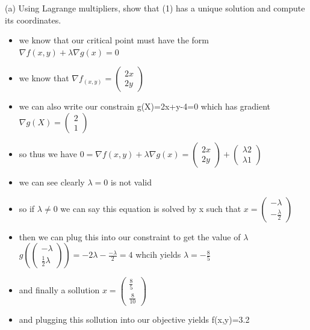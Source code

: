 \documentclass[10pt]{article}
\begin{document}
(a) Using Lagrange multipliers, show that (1) has a unique solution and compute its coordinates.
\begin{itemize}
    \item we know that our critical point must have the form $\nabla f(x,y)+\lambda \nabla g(x)=0$
    \item we know that $\nabla f_(x,y)=\begin{pmatrix}
        2x\\2y
    \end{pmatrix}$
    \item we can also write our constrain g(X)=2x+y-4=0 which has gradient $\nabla g(X)=\begin{pmatrix}
        2\\1
    \end{pmatrix}$
    \item so thus we have  $0=\nabla f(x,y)+\lambda \nabla g(x)=\begin{pmatrix}
        2x\\2y
    \end{pmatrix}+\begin{pmatrix}
        \lambda 2\\\lambda 1\end{pmatrix}$ 
        \item we can see clearly $\lambda=0$ is not valid 
        \item so if $\lambda\neq 0$ we can say  this equation is solved by x such that $x=\begin{pmatrix}
        -\lambda\\-\frac{\lambda}{2} \end{pmatrix}$
        \item then we can plug this into our constraint to get the value of $\lambda$ $g(\begin{pmatrix}
            -\lambda\\\frac{1}{2}\lambda 
        \end{pmatrix})=-2\lambda -\frac{-\lambda}{2}=4$ whcih yields $\lambda=-\frac{8}{5}$
        \item and finally a sollution $x=\begin{pmatrix}
        \frac{8}{5}\\\frac{8}{10} \end{pmatrix}$
        \item and plugging this sollution into our objective yields f(x,y)=3.2
\end{itemize}
\newline
\\ 
\\
\end{document}
